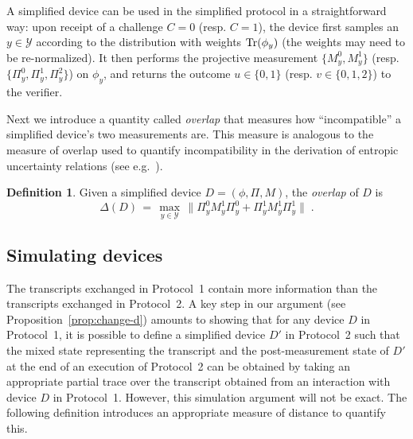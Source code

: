 \documentclass[11pt]{article}
\theoremstyle{remark}
\theoremstyle{definition}
\newtheorem{definition}[theorem]{Definition}
\newcommand{\Tr}{\mbox{\rm Tr}}
\newcommand{\mY}{\ensuremath{\mathcal{Y}}}
\begin{document}
A simplified device can be used in the simplified protocol in a straightforward way: upon receipt of a challenge $C=0$ (resp. $C=1$), the device first samples an $y\in\mY$ according to the distribution with weights $\Tr(\phi_y)$ (the weights may need to be re-normalized). It then performs the projective measurement $\{M_y^0,M_y^1\}$ (resp. $\{\Pi_y^0,\Pi_y^1,\Pi_y^2 \}$) on $\phi_y$, and returns the outcome $u\in\{0,1\}$ (resp. $v\in\{0,1,2\}$) to the verifier. 

Next we introduce a quantity called \emph{overlap} that measures how ``incompatible'' a simplified device's two measurements are. This measure is analogous to the measure of overlap used to quantify incompatibility in the derivation of entropic uncertainty relations (see e.g.~\cite{maassen1988generalized}). 

\begin{definition}\label{def:overlap}
Given a simplified device $D=(\phi,\Pi,M)$, the \emph{overlap} of $D$ is 
\[\Delta(D)\,=\,\max_{y\in\mY}\,\big\|\Pi_y^0 M_y^1 \Pi_y^0 + \Pi_y^1 M_y^1 \Pi_y^1 \big\|\;.\]
\end{definition}

\subsection{Simulating devices}
\label{sec:sim-dev}

The transcripts exchanged in Protocol~1 contain more information than the transcripts exchanged in Protocol~2. A key step in our argument (see Proposition~\ref{prop:change-d}) amounts to showing that for any device $D$ in Protocol~1, it is possible to define a simplified device $D'$ in Protocol~2 such that the mixed state representing the transcript and the post-measurement state of $D'$ at the end of an execution of Protocol~2 can be obtained by taking an appropriate partial trace over the transcript obtained from an interaction with device $D$ in Protocol~1. However, this simulation argument will not be exact. The following definition introduces an appropriate measure of distance to quantify this. 
\end{document}
